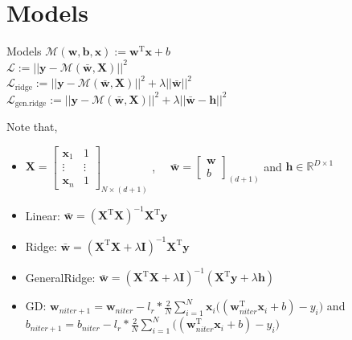 \documentclass[aspectratio=169]{beamer}
\begin{document}
\section{Models}
\begin{frame}{Models}
  \centering
  $\mathcal{M}(\mathbf{w,b,\mathbf{x}}):= \mathbf{w}^\text{T}\mathbf{x}+b$ \\

  $\mathcal{L}:=||\mathbf{y}-\mathcal{M}(\bar{\mathbf{w}}, \mathbf{X})||^2$ \\ 

  $\mathcal{L}_{\text{ridge}}:=||\mathbf{y}-\mathcal{M}(\bar{\mathbf{w}}, \mathbf{X})||^2+\lambda||\bar{\mathbf{w}}||^2$ \\

  $\mathcal{L}_{\text{gen.ridge}}:=||\mathbf{y}-\mathcal{M}(\bar{\mathbf{w}}, \mathbf{X})||^2+\lambda||\bar{\mathbf{w}}-\mathbf{h}||^2$ \\
{
  \begin{block}{\color{White} Note that,}
    \begin{itemize}
      \centering
      \item $\mathbf{X}=\begin{bmatrix}\mathbf{x}_1& 1\\ \vdots & \vdots \\ \mathbf{x}_n& 1\end{bmatrix}_{N\times(d+1)}$ , $\quad\bar{\mathbf{w}}=\begin{bmatrix}\mathbf{w}\\ {b}\end{bmatrix}_{(d+1)}$ and  $\mathbf{h}\in\mathbb{R}^{D\times 1}$
    \end{itemize}
  \end{block}
}
{
  \begin{itemize}
    \item Linear:  $\bar{\mathbf{w}}=(\mathbf{X}^{\text{T}}\mathbf{X})^{-1}\mathbf{X}^{\text{T}}\mathbf{y}$
    \item Ridge:  $\bar{\mathbf{w}}=(\mathbf{X}^{\text{T}}\mathbf{X}+\lambda\mathbf{I})^{-1}\mathbf{X}^{\text{T}}\mathbf{y}$
    \item GeneralRidge\cite{Denevi2018a}:  $\bar{\mathbf{w}}=(\mathbf{X}^{\text{T}}\mathbf{X}+\lambda\mathbf{I})^{-1}(\mathbf{X}^{\text{T}}\mathbf{y}+\lambda\mathbf{h})$
    \item GD: $\mathbf{w}_{niter+1}=\mathbf{w}_{niter}-l_r*\frac{2}{N}\sum_{i=1}^{N}\mathbf{x}_i\big((\mathbf{w}_{niter}^{\text{T}}\mathbf{x}_i+b)-y_i\big)$ and $b_{niter+1}=b_{niter}-l_r*\frac{2}{N}\sum_{i=1}^{N}\big((\mathbf{w}_{niter}^{\text{T}}\mathbf{x}_i+b)-y_i\big)$
  \end{itemize}
}
\end{frame}
\end{document}
